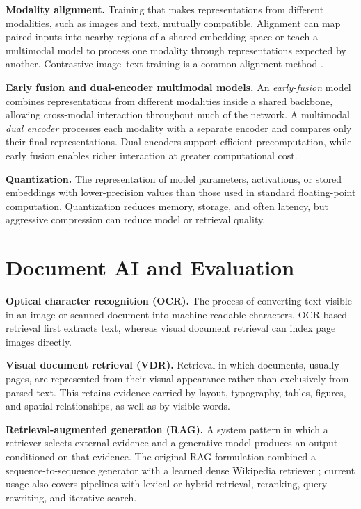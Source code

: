 \noindent\textbf{Modality alignment.}
Training that makes representations from different modalities, such as images
and text, mutually compatible. Alignment can map paired inputs into nearby
regions of a shared embedding space or teach a multimodal model to process one
modality through representations expected by another. Contrastive image--text
training is a common alignment method .

\noindent\textbf{Early fusion and dual-encoder multimodal models.}
An \emph{early-fusion} model combines representations from different modalities
inside a shared backbone, allowing cross-modal interaction throughout much of
the network. A multimodal \emph{dual encoder} processes each modality with a
separate encoder and compares only their final representations. Dual encoders
support efficient precomputation, while early fusion enables richer interaction
at greater computational cost.

\noindent\textbf{Quantization.}
The representation of model parameters, activations, or stored embeddings with
lower-precision values than those used in standard floating-point computation.
Quantization reduces memory, storage, and often latency, but aggressive
compression can reduce model or retrieval quality.

\section*{Document AI and Evaluation}

\noindent\textbf{Optical character recognition (OCR).}
The process of converting text visible in an image or scanned document into
machine-readable characters. OCR-based retrieval first extracts text, whereas
visual document retrieval can index page images directly.

\noindent\textbf{Visual document retrieval (VDR).}
Retrieval in which documents, usually pages, are represented from their visual
appearance rather than exclusively from parsed text. This retains evidence
carried by layout, typography, tables, figures, and spatial relationships, as
well as by visible words.

\noindent\textbf{Retrieval-augmented generation (RAG).}
A system pattern in which a retriever selects external evidence and a generative
model produces an output conditioned on that evidence. The original RAG
formulation combined a sequence-to-sequence generator with a learned dense
Wikipedia retriever ; current usage also
covers pipelines with lexical or hybrid retrieval, reranking, query rewriting,
and iterative search.

